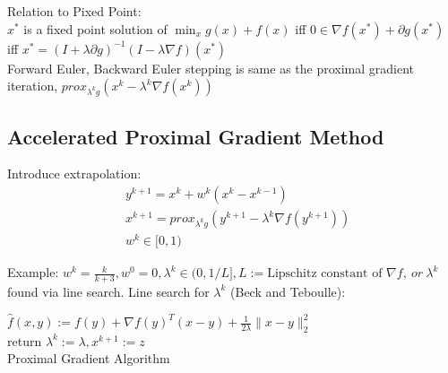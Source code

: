 \documentclass[8pt,letter]{article}
\begin{document}
\begin{multicols*}{2}
  Relation to Pixed Point:\\
  $x^*$ is a fixed point solution of $\min_{x} g(x)+f(x)$ iff $0 \in \nabla f(x^*) + \partial g(x^*)$ iff $x^* = (I+\lambda \partial g)^{-1}(I-\lambda \nabla f)(x^*)$\\
  
  Forward Euler, Backward Euler stepping is same as the proximal gradient iteration, $prox_{\lambda^k g}(x^k-\lambda^k \nabla f(x^k))$\\

  \subsection{Accelerated Proximal Gradient Method}
  Introduce extrapolation:
  \begin{align*}
    &y^{k+1} = x^k + w^k(x^k-x^{k-1})\\
    &x^{k+1} = prox_{\lambda^k g}(y^{k+1}-\lambda^k \nabla f(y^{k+1}))\\
    &w^k \in [0,1)
  \end{align*}

  Example: $w^k = \frac{k}{k+3}, w^0 = 0, \lambda^k \in (0,1/L], L:= \text{Lipschitz constant of }\nabla f,\ or\ \lambda^k$ found via line search.
  Line search for $\lambda^k$ (Beck and Teboulle):

  \begin{algorithm}[H]
    $\hat{f}(x,y):=f(y) + \nabla f(y)^T(x-y) + \frac{1}{2\lambda}\|x-y\|^2_2$\\
    return $\lambda^k := \lambda, x^{k+1} := z$\\
    \caption{Proximal Gradient Algorithm\label{Algo_ProximalGradient}}
  \end{algorithm}


\end{multicols*}
\end{document}
